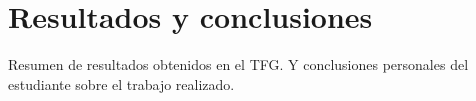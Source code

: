 \chapter{Resultados y conclusiones}

Resumen de resultados obtenidos en el TFG. Y conclusiones personales del estudiante sobre el trabajo realizado.
